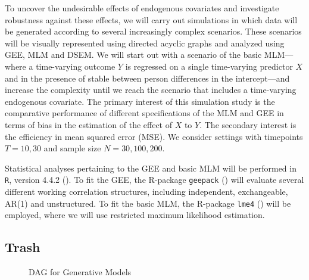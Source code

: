 \documentclass[
  12pt,
  a4paper,
]{article}
\begin{document}
To uncover the undesirable effects of endogenous covariates and
investigate robustness against these effects, we will carry out
simulations in which data will be generated according to several
increasingly complex scenarios. These scenarios will be visually
represented using directed acyclic graphs and analyzed using GEE, MLM
and DSEM. We will start out with a scenario of the basic MLM---where a
time-varying outcome \(Y\) is regressed on a single time-varying
predictor \(X\) and in the presence of stable between person differences
in the intercept---and increase the complexity until we reach the
scenario that includes a time-varying endogenous covariate. The primary
interest of this simulation study is the comparative performance of
different specifications of the MLM and GEE in terms of bias in the
estimation of the effect of \(X\) to \(Y\). The secondary interest is
the efficiency in mean squared error (MSE). We consider settings with
timepoints \(T = 10,30\) and sample size \(N = 30, 100, 200\).

Statistical analyses pertaining to the GEE and basic MLM will be
performed in \texttt{R}, version 4.4.2
(). To fit the GEE, the
R-package \texttt{geepack} () will evaluate several different working correlation structures,
including independent, exchangeable, AR(1) and unstructured. To fit the
basic MLM, the R-package \texttt{lme4} () will be employed, where we will use restricted maximum
likelihood estimation.

\subsection{Trash}\label{trash}

\begin{figure}[H]

\begin{minipage}{0.50\linewidth}
DAG for Generative Models\end{minipage}%

\end{figure}%
\end{document}
